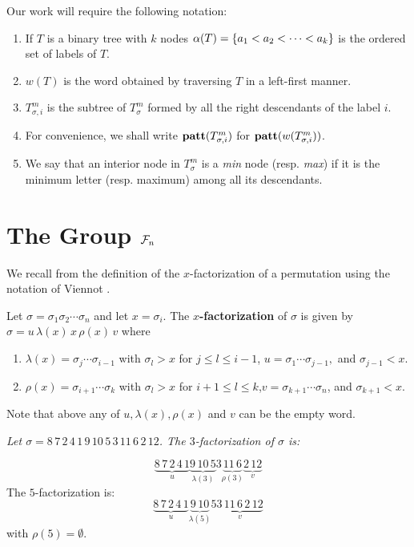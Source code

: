 Our work will require  the following notation:

\begin{enumerate}
\item If $T$ is a binary tree with $k$ nodes 
${\bf \alpha}(T) = \{ a_1 < a_2 < \cdots < a_k\}$ is the ordered set of labels 
of $T$.
\item $w(T)$ is the word obtained by traversing $T$ in a left-first 
manner.
\item $T^m_{\sigma,i}$ is the subtree of $T^m_\sigma$ formed 
by all the right descendants of the label $i$.
\item For convenience, we shall write ${\bf patt}(T^m_{\sigma,i})$
for ${\bf patt}(w(T^m_{\sigma,i}))$.
\item We say that an interior node in $T_\sigma^m$ is a {\em min} node
(resp. {\em max}) if it is the minimum letter (resp. maximum) among
all its descendants.
\end{enumerate}


\section{The Group ${\cal F}_n$}
\label{s_Fn}

We recall from \cite{Foata-Strehl2} the definition of the $x$-factorization of
a permutation using the notation of Viennot \cite{vien1}.

\begin{define}
Let $\sigma = \sigma_1 \sigma_2 \cdots \sigma_n$ and let $x = \sigma_i$.
The {\bf $x$-factorization} of $\sigma$ is given by $\sigma = u\,\lambda(x)\,x\,\rho(x)\,v$ where
\begin{enumerate}
\item $\lambda(x) = \sigma_j\cdots\sigma_{i-1}$ with $\sigma_l > x$
for $j \le l \le i-1$, $u = \sigma_1\cdots\sigma_{j-1},$ and $\sigma_{j-1} < x$.
\item $\rho(x) = \sigma_{i+1}\cdots\sigma_{k}$ with $\sigma_l > x$
for $i+1 \le l \le k$,$v = \sigma_{k+1}\cdots\sigma_n$, and $\sigma_{k+1}<x$.
\end{enumerate}
Note that above any of $u, \lambda(x), \rho(x)$ and $v$ can be the 
empty word.
\end{define}

\begin{example}
{\em Let $\sigma = 8\,7\,2\,4\,1\,9\,10\,5\,3\,11\,6\,2\,12$.
The $3$-factorization of $\sigma$ is:

$$
\underbrace{8\,7\,2\,4\,1}_{u}
\underbrace{9\,10\,5}_{\lambda(3)}3\underbrace{11\,6}_{\rho(3)}
\underbrace{2\,12}_{v}
$$
The $5$-factorization is:
$$
\underbrace{8\,7\,2\,4\,1}_{u}
\underbrace{9\,10}_{\lambda(5)}5
\underbrace{3\,11\,6\,2\,12}_{v}
$$
with $\rho(5) = \emptyset$.}
\end{example}

